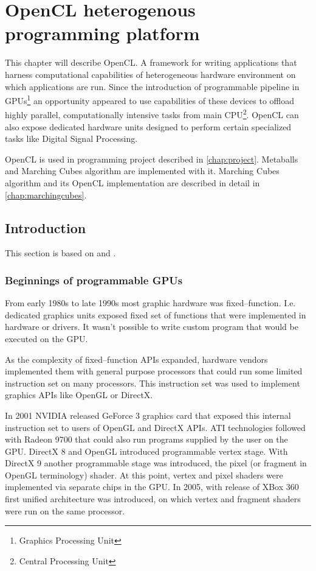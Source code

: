 \chapter{OpenCL heterogenous programming platform}
This chapter will describe OpenCL. A framework for writing applications that
harness computational capabilities of heterogeneous hardware environment on
which applications are run. Since the introduction of programmable pipeline
in GPUs\footnote{Graphics Processing Unit} an opportunity appeared to use
capabilities of these devices to offload highly parallel, computationally
intensive tasks from main CPU\footnote{Central Processing Unit}. OpenCL can also
expose dedicated hardware units designed to perform certain specialized tasks
like Digital Signal Processing.

OpenCL is used in programming project described in \autoref{chap:project}.
Metaballs and Marching Cubes algorithm are implemented with it. Marching Cubes
algorithm and its OpenCL implementation are described in detail in
\autoref{chap:marchingcubes}.
\section{Introduction}
This section is based on \cite{Kirk:2010:PMP:1841511} and
\cite{gaster2012heterogeneous}.

\subsection{Beginnings of programmable GPUs}

From early 1980s to late 1990s most graphic hardware was fixed--function.
I.e. dedicated graphics units exposed fixed set of functions that were
implemented in hardware or drivers. It wasn't possible to write custom program
that would be executed on the GPU.

As the complexity of fixed--function APIs expanded, hardware vendors implemented
them with general purpose processors that could run some limited instruction set
on many processors. This instruction set was used to implement graphics APIs
like OpenGL or DirectX.

In 2001 NVIDIA released GeForce 3 graphics card that exposed this internal
instruction set to users of OpenGL and DirectX APIs. ATI technologies followed
with Radeon 9700 that could also run programs supplied by the user on the GPU.
DirectX 8 and OpenGL introduced programmable vertex stage. With
DirectX 9 another programmable stage was introduced, the pixel (or fragment in
OpenGL terminology) shader. At this point, vertex and pixel shaders were
implemented via separate chips in the GPU. In 2005, with release of XBox 360
first unified architecture was introduced, on which vertex and fragment shaders
were run on the same processor.

